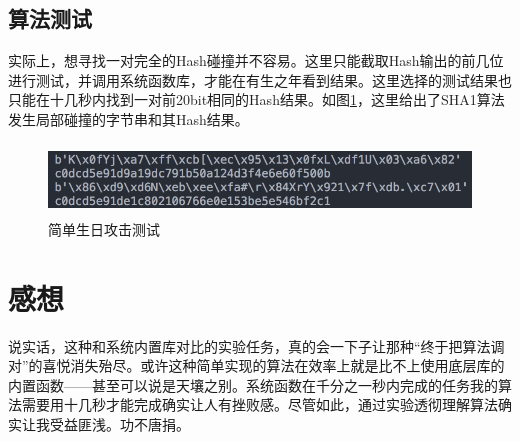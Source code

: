 \documentclass[11pt]{ctexart}
\begin{document}
\subsection{算法测试} %
实际上，想寻找一对完全的Hash碰撞并不容易。这里只能截取Hash输出的前几位进行测试，并调用系统函数库，才能在有生之年看到结果。这里选择的测试结果也只能在十几秒内找到一对前20bit相同的Hash结果。如图\ref{img_attack}，这里给出了SHA1算法发生局部碰撞的字节串和其Hash结果。
\begin{figure}[htbp]
\centering
\includegraphics[width=14.06cm, height=1.90cm]{attack.png}
\caption{简单生日攻击测试}
\label{img_attack}
\end{figure}
\section{感想} %
说实话，这种和系统内置库对比的实验任务，真的会一下子让那种“终于把算法调对”的喜悦消失殆尽。或许这种简单实现的算法在效率上就是比不上使用底层库的内置函数——甚至可以说是天壤之别。系统函数在千分之一秒内完成的任务我的算法需要用十几秒才能完成确实让人有挫败感。尽管如此，通过实验透彻理解算法确实让我受益匪浅。功不唐捐。
\end{document}
